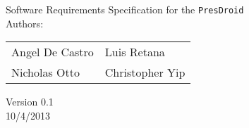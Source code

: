 \begin{titlepage}
\Huge
\vspace{2cm}
\begin{center}
Software Requirements Specification for the \texttt{PresDroid}\\
\vspace{3cm}
\Large
Authors:\\ 

\begin{tabular}{l l}\hline
Angel De Castro & Luis Retana\\
Nicholas Otto   & Christopher Yip
\end{tabular}
\vspace{1cm}

Version 0.1\\
10/4/2013
\end{center}


\end{titlepage}

